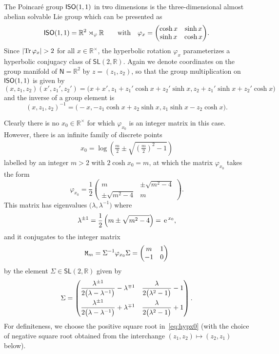 \documentclass[10pt,a4paper]{amsart}
\numberwithin{equation}{section}
\newcommand{\sfN}{\mathsf{N}}
\newcommand{\sfSL}{\mathsf{SL}}
\newcommand{\ISO}{{\sf ISO}}
\newcommand{\real}{{\mathbb R}} %
\newcommand{\Tr}[1]{{\rm Tr}\,#1}
\def\e{{\,\rm e}\,}
\begin{document}
The Poincar\'e group $\ISO(1,1)$ in two dimensions is the
three-dimensional almost abelian solvable Lie group which can be presented as
\[
\ISO(1,1) = \real^2\rtimes_\varphi\real \qquad \mbox{with} \quad
\varphi_x = \bigg(\begin{matrix} \cosh x & \sinh x \\ \sinh x &
 \cosh x \end{matrix}\bigg) .
\]
Since $|\Tr\varphi_x|>2$ for all $x\in\real^\times$, the hyperbolic rotation
$\varphi_x$ parameterizes a hyperbolic conjugacy class of
$\sfSL(2,\real)$. Again we denote coordinates on the group
manifold of $\sfN=\real^2$
by $z=(z_1,z_2)$, so that the group multiplication on
$\ISO(1,1)$ is given by
\[
(x,z_1,z_2) (x',z_1',z_2') = \big(x+x' , z_1+z_1'\cosh
x+z_2'\sinh x ,
z_2+z_1'\sinh x+z_2'\cosh x\big)
\]
and the inverse of a group element is
\[
(x,z_1,z_2)^{-1} = \big({-}x , -z_1\cosh x+z_2\sinh x , z_1\sinh
x-z_2\cosh x\big) .
\]

Clearly there is no $x_0\in\real^\times$ for which $\varphi_{x_0}$ is
an integer matrix in this case. However, there is an infinite family of discrete points
\begin{gather}\label{eq:hypx0}
x_0 = \log\left(\frac m2 \pm \sqrt{\left(\frac m2\right)^2-1}\right)
\end{gather}
labelled by an integer $m>2$ with $2\cosh x_0=m$, at which
the matrix $\varphi_{x_0}$ takes the form
\[
\varphi_{x_0} = \frac12 \left(\begin{matrix} m & \pm \sqrt{m^2-4}
 \\ \pm \sqrt{m^2-4} &
 m \end{matrix}\right) .
\]
This matrix has eigenvalues $\big(\lambda,\lambda^{-1}\big)$ where
\[
\lambda^{\pm1} = \frac12 \left(m\pm\sqrt{m^2-4}\right) = \e^{x_0} ,
\]
and it conjugates to the integer matrix
\begin{gather}\label{eq:monhyp}
{\tt M}_m = \Sigma^{-1} \varphi_{x_0} \Sigma =
\left(\begin{matrix} m & 1 \\ -1 & 0 \end{matrix}\right)
\end{gather}
by the element $\Sigma\in\sfSL(2,\real)$ given by
\begin{gather}\label{eq:hypSigma}
\Sigma = \begin{pmatrix} \dfrac{\lambda^{\pm1}}{2 \big(\lambda-\lambda^{-1}\big)} - \lambda^{\mp1} & \dfrac\lambda{2 \big(\lambda^2-1\big)}-1 \vspace{1mm}\\ \dfrac{\lambda^{\pm1}}{2 \big(\lambda-\lambda^{-1}\big)} + \lambda^{\mp1} &
 \dfrac\lambda{2 \big(\lambda^2-1\big)} + 1 \end{pmatrix} .
\end{gather}
For definiteness, we choose the positive square root in~\eqref{eq:hypx0} (with the choice of negative square root obtained
from the interchange $(z_1,z_2)\mapsto(z_2,z_1)$ below).
\end{document}
